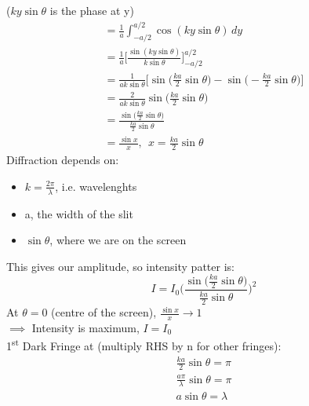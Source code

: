 \documentclass[a4paper, 11pt, fleqn, normalem]{report}
\begin{document}
($ky\sin{\theta}$ is the phase at y)
\begin{gather*}
    = \frac{1}{a} \int_{-a/2}^{a/2} \cos{(ky\sin{\theta})}\,dy \\
    = \frac{1}{a} \Big[\frac{\sin{(ky\sin{\theta})}}{k\sin{\theta}}\Big]^{a/2}_{-a/2} \\
    = \frac{1}{ak\sin{\theta}} \Big[\sin{\Big(\frac{ka}{2}\sin{\theta}\Big)} - \sin{\Big(-\frac{ka}{2}\sin{\theta}\Big)}\Big] \\
    = \frac{2}{ak\sin{\theta}}\sin{\Big(\frac{ka}{2}\sin{\theta}\Big)} \\
    = \frac{\sin{\big(\tfrac{ka}{2}\sin{\theta}\big)}}{\tfrac{ka}{2}\sin{\theta}}\\
    = \frac{\sin{x}}{x},~~x = \frac{ka}{2}\sin{\theta}
\end{gather*}
Diffraction depends on:
\begin{itemize}
    \item[] $k = \frac{2\pi}{\lambda}$, i.e. wavelenghts
    \item[] a, the width of the slit
    \item[] $\sin{\theta}$, where we are on the screen
\end{itemize}
This gives our amplitude, so intensity patter is:
\begin{equation*}
    I = I_{0}\Bigg(\frac{\sin{\big(\tfrac{ka}{2}\sin{\theta}\big)}}{\tfrac{ka}{2}\sin{\theta}}\Bigg)^{2}
\end{equation*}
At $\theta = 0$ (centre of the screen), $\frac{\sin{x}}{x} \rightarrow 1$ \\
$\implies$ Intensity is maximum, $I =I_{0}$ \\
1\textsuperscript{st} Dark Fringe at (multiply RHS by n for other fringes):
\begin{gather*}
    \frac{ka}{2}\sin{\theta} = \pi \\
    \frac{a\pi}{\lambda}\sin{\theta} = \pi \\
    a\sin{\theta} = \lambda
\end{gather*}
\end{document}
